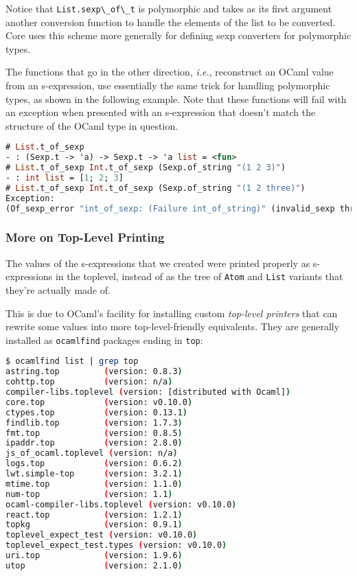 Notice that \passthrough{\lstinline!List.sexp\_of\_t!} is polymorphic
and takes as its first argument another conversion function to handle
the elements of the list to be converted. Core uses this scheme more
generally for defining sexp converters for polymorphic types.

The functions that go in the other direction, \emph{i.e.}, reconstruct
an OCaml value from an s-expression, use essentially the same trick for
handling polymorphic types, as shown in the following example. Note that
these functions will fail with an exception when presented with an
s-expression that doesn't match the structure of the OCaml type in
question.

\begin{lstlisting}[language=Caml]
# List.t_of_sexp
- : (Sexp.t -> 'a) -> Sexp.t -> 'a list = <fun>
# List.t_of_sexp Int.t_of_sexp (Sexp.of_string "(1 2 3)")
- : int list = [1; 2; 3]
# List.t_of_sexp Int.t_of_sexp (Sexp.of_string "(1 2 three)")
Exception:
(Of_sexp_error "int_of_sexp: (Failure int_of_string)" (invalid_sexp three))
\end{lstlisting}

\hypertarget{more-on-top-level-printing}{%
\subsubsection{More on Top-Level
Printing}\label{more-on-top-level-printing}}

The values of the s-expressions that we created were printed properly as
s-expressions in the toplevel, instead of as the tree of
\passthrough{\lstinline!Atom!} and \passthrough{\lstinline!List!}
variants that they're actually made of. 

This is due to OCaml's facility for installing custom \emph{top-level
printers} that can rewrite some values into more top-level-friendly
equivalents. They are generally installed as
\passthrough{\lstinline!ocamlfind!} packages ending in
\passthrough{\lstinline!top!}:

\begin{lstlisting}[language=bash]
$ ocamlfind list | grep top
astring.top         (version: 0.8.3)
cohttp.top          (version: n/a)
compiler-libs.toplevel (version: [distributed with Ocaml])
core.top            (version: v0.10.0)
ctypes.top          (version: 0.13.1)
findlib.top         (version: 1.7.3)
fmt.top             (version: 0.8.5)
ipaddr.top          (version: 2.8.0)
js_of_ocaml.toplevel (version: n/a)
logs.top            (version: 0.6.2)
lwt.simple-top      (version: 3.2.1)
mtime.top           (version: 1.1.0)
num-top             (version: 1.1)
ocaml-compiler-libs.toplevel (version: v0.10.0)
react.top           (version: 1.2.1)
topkg               (version: 0.9.1)
toplevel_expect_test (version: v0.10.0)
toplevel_expect_test.types (version: v0.10.0)
uri.top             (version: 1.9.6)
utop                (version: 2.1.0)
\end{lstlisting}


